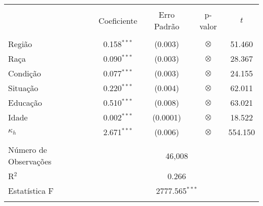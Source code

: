 
\begin{table}[!htbp] \centering 
  \caption{} 
  \label{} 
  \begin{tabular}{@{\extracolsep{5pt}}lcccc} 
  \\[-1.8ex]\hline 
  \hline \\[-1.8ex] 
   & Coeficiente & Erro Padrão & p-valor & \(t\) \\ 
  \hline \\[-1.8ex] 
   Região & 0.158$^{***}$ & (0.003) & \(\otimes\) & 51.460 \\ 
   Raça & 0.090$^{***}$ & (0.003) & \(\otimes\) & 28.367 \\ 
   Condição & 0.077$^{***}$ & (0.003) & \(\otimes\) & 24.155 \\ 
   Situação & 0.220$^{***}$ & (0.004) & \(\otimes\) & 62.011 \\ 
   Educação & 0.510$^{***}$ & (0.008) & \(\otimes\) & 63.021 \\ 
   Idade & 0.002$^{***}$ & (0.0001) & \(\otimes\) & 18.522 \\ 
   \(\kappa_h\) & 2.671$^{***}$ & (0.006) & \(\otimes\) & 554.150 \\ 
  \hline \\[-1.8ex] 
  Número de Observações & \multicolumn{4}{c}{46,008} \\ 
  R$^{2}$ & \multicolumn{4}{c}{0.266} \\ 
  Estatística F & \multicolumn{4}{c}{2777.565$^{***}$} \\ 
  \hline 
  \hline \\[-1.8ex] 
  \end{tabular} 
\end{table}

